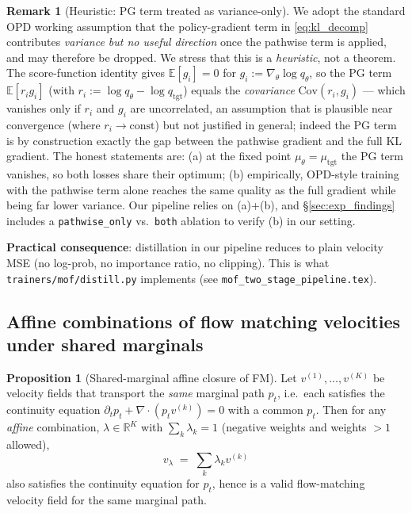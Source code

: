 \documentclass[11pt,a4paper]{article}
\newcommand{\E}{\mathbb{E}}
\newcommand{\R}{\mathbb{R}}
\newcommand{\const}{\mathrm{const}}
\theoremstyle{definition}
\newtheorem{remark}{Remark}
\newtheorem{proposition}{Proposition}
\begin{document}
\begin{remark}[Heuristic: PG term treated as variance-only]
\label{prop:pg_zero}
We adopt the standard OPD working assumption that the policy-gradient term
in \eqref{eq:kl_decomp} contributes \emph{variance but no useful direction}
once the pathwise term is applied, and may therefore be dropped. We stress
that this is a \emph{heuristic}, not a theorem. The score-function identity
gives $\E[g_i]=0$ for $g_i := \nabla_\theta\log q_\theta$, so the PG term
$\E[r_i g_i]$ (with $r_i := \log q_\theta - \log q_{\mathrm{tgt}}$) equals
the \emph{covariance} $\mathrm{Cov}(r_i, g_i)$ — which vanishes only if
$r_i$ and $g_i$ are uncorrelated, an assumption that is plausible near
convergence (where $r_i\to\const$) but not justified in general; indeed the
PG term is by construction exactly the gap between the pathwise gradient
and the full KL gradient. The honest statements are: (a) at the fixed point
$\mu_\theta=\mu_{\mathrm{tgt}}$ the PG term vanishes, so both losses share
their optimum; (b) empirically, OPD-style training with the pathwise term
alone reaches the same quality as the full gradient while being far lower
variance. Our pipeline relies on (a)+(b), and \S\ref{sec:exp_findings}
includes a \texttt{pathwise\_only} vs.\ \texttt{both} ablation to verify
(b) in our setting.
\end{remark}

\textbf{Practical consequence}: distillation in our pipeline reduces to
plain velocity MSE (no log-prob, no importance ratio, no clipping). This is
what \texttt{trainers/mof/distill.py} implements (see
\texttt{mof\_two\_stage\_pipeline.tex}).

\subsection{Affine combinations of flow matching velocities under shared
marginals}
\label{ssec:affine_fm}

\begin{proposition}[Shared-marginal affine closure of FM]
\label{prop:convex_fm}
Let $v^{(1)},\ldots,v^{(K)}$ be velocity fields that transport the
\emph{same} marginal path $p_t$, i.e.\ each satisfies the continuity
equation $\partial_t p_t + \nabla\!\cdot(p_t v^{(k)})=0$ with a common
$p_t$. Then for any \emph{affine} combination, $\lambda\in\R^K$ with
$\sum_k\lambda_k=1$ (negative weights and weights $>1$ allowed),
\begin{equation}
v_\lambda \;=\; \sum_k \lambda_k v^{(k)}
\end{equation}
also satisfies the continuity equation for $p_t$, hence is a valid
flow-matching velocity field for the same marginal path.
\end{proposition}
\end{document}
